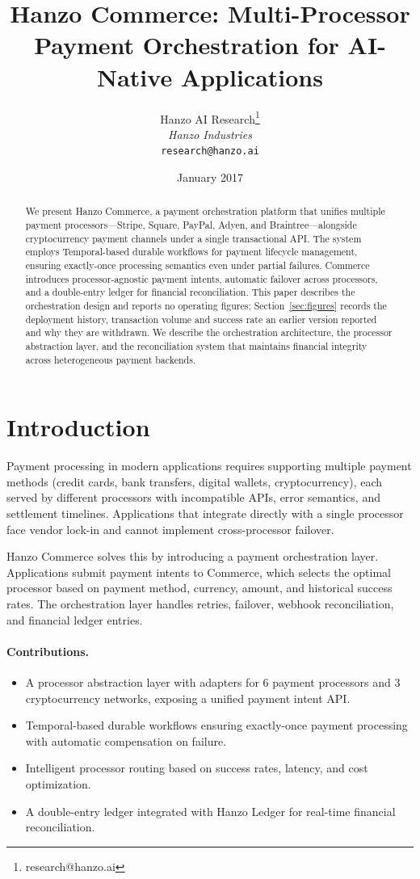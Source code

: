 \documentclass[11pt,twocolumn]{article}
\title{Hanzo Commerce: Multi-Processor Payment Orchestration for AI-Native Applications}
\author{Hanzo AI Research\thanks{research@hanzo.ai} \\ \textit{Hanzo Industries} \\ \texttt{research@hanzo.ai}}
\date{January 2017}
\begin{document}
\hanzocoverpage

\begin{abstract}
We present Hanzo Commerce, a payment orchestration platform that unifies multiple payment processors---Stripe, Square, PayPal, Adyen, and Braintree---alongside cryptocurrency payment channels under a single transactional API. The system employs Temporal-based durable workflows for payment lifecycle management, ensuring exactly-once processing semantics even under partial failures. Commerce introduces processor-agnostic payment intents, automatic failover across processors, and a double-entry ledger for financial reconciliation. This paper describes the orchestration design and reports no operating figures; Section~\ref{sec:figures} records the deployment history, transaction volume and success rate an earlier version reported and why they are withdrawn. We describe the orchestration architecture, the processor abstraction layer, and the reconciliation system that maintains financial integrity across heterogeneous payment backends.
\end{abstract}

\section{Introduction}

Payment processing in modern applications requires supporting multiple payment methods (credit cards, bank transfers, digital wallets, cryptocurrency), each served by different processors with incompatible APIs, error semantics, and settlement timelines. Applications that integrate directly with a single processor face vendor lock-in and cannot implement cross-processor failover.

Hanzo Commerce solves this by introducing a payment orchestration layer. Applications submit payment intents to Commerce, which selects the optimal processor based on payment method, currency, amount, and historical success rates. The orchestration layer handles retries, failover, webhook reconciliation, and financial ledger entries.

\paragraph{Contributions.}
\begin{itemize}
    \item A processor abstraction layer with adapters for 6 payment processors and 3 cryptocurrency networks, exposing a unified payment intent API.
    \item Temporal-based durable workflows ensuring exactly-once payment processing with automatic compensation on failure.
    \item Intelligent processor routing based on success rates, latency, and cost optimization.
    \item A double-entry ledger integrated with Hanzo Ledger for real-time financial reconciliation.
\end{itemize}
\end{document}
